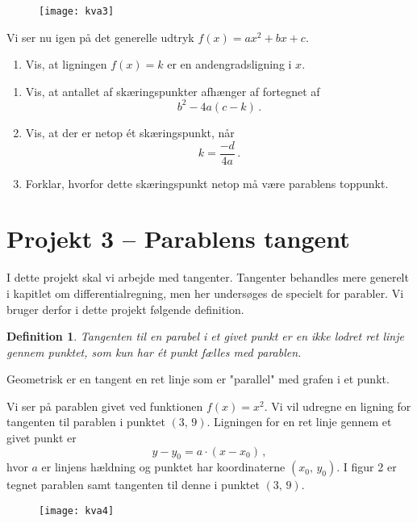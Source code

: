\documentclass[12pt,oneside,a4paper]{article}
\theoremstyle{plain}
\newtheorem*{mydef}{Definition}
\begin{document}
\begin{figure}[ht]
    \centering
    \texttt{[image: kva3]}
    \caption{}
    \label{fig3}
\end{figure}

Vi ser nu igen på det generelle udtryk $f(x) = ax^2 + bx + c$.
\begin{enumerate}[label=(\alph*)]
    \item Vis, at ligningen $f(x) = k$ er en andengradsligning i $x$.
\end{enumerate}

\begin{enumerate}[label=(\alph*), resume]
    \item Vis, at antallet af skæringspunkter afhænger af fortegnet af 
        \[
            b^2-4a(c-k) \,.
        \]
    \item Vis, at der er netop ét skæringspunkt, når
        \[
            k = \frac{-d}{4a} \,.
        \]
    \item Forklar, hvorfor dette skæringspunkt netop må være parablens toppunkt.
\end{enumerate}


\section*{Projekt 3 -- Parablens tangent}
I dette projekt skal vi arbejde med tangenter. Tangenter behandles mere generelt
i kapitlet om differentialregning, men her undersøges de specielt for parabler.
Vi bruger derfor i dette projekt følgende definition.
\begin{mydef}
    Tangenten til en parabel i et givet punkt er en ikke lodret ret linje
    gennem punktet, som kun har ét punkt fælles med parablen.
\end{mydef}
Geometrisk er en tangent en ret linje som er "parallel" med grafen i et punkt.

Vi ser på parablen givet ved funktionen $f(x)=x^2$. Vi vil udregne en ligning 
for tangenten til parablen i punktet $(3,\, 9)$. Ligningen for en ret linje gennem
et givet punkt er 
\[
    y-y_0 = a\cdot (x-x_0) \,,
\]
hvor $a$ er linjens hældning og punktet har koordinaterne $(x_0,\, y_0)$.
I figur 2 er tegnet parablen samt tangenten til denne i punktet $(3,\, 9)$.

\begin{figure}[ht]
    \centering
    \texttt{[image: kva4]}
    \caption{}
    \label{fig4}
\end{figure}
\end{document}
